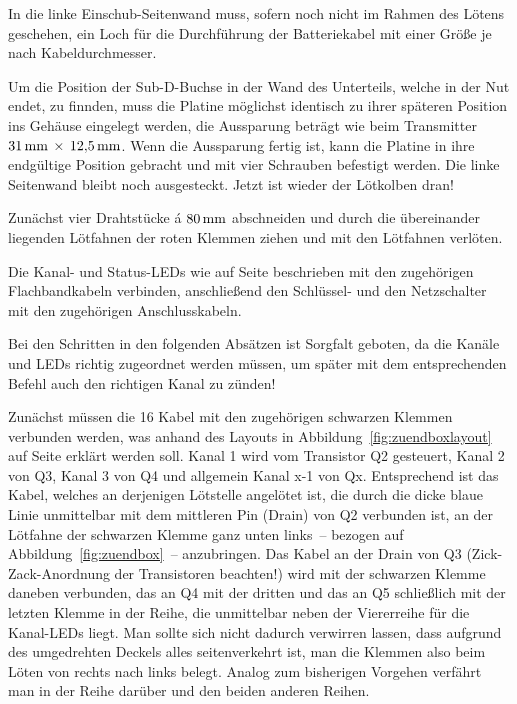 \documentclass[pdftex, parskip, numbers=noenddot, toc=listof]{scrbook}
\begin{document}
	In die linke Einschub-Seitenwand muss, sofern noch nicht im Rahmen des Lötens geschehen, ein Loch für die Durchführung der Batteriekabel mit einer Größe je nach Kabeldurchmesser.

	Um die Position der Sub-D-Buchse in der Wand des Unterteils, welche in der Nut endet, zu finnden, muss die Platine möglichst identisch zu ihrer späteren Position ins Gehäuse eingelegt werden, die Aussparung beträgt wie beim Transmitter $\unit[31]{mm}\,\times\,\unit[12{,}5]{mm}$. Wenn die Aussparung fertig ist, kann die Platine in ihre endgültige Position gebracht und mit vier Schrauben befestigt werden. Die linke Seitenwand bleibt noch ausgesteckt. Jetzt ist wieder der Lötkolben dran!

	Zunächst vier Drahtstücke á $\unit[80]{mm}$ abschneiden und durch die übereinander liegenden Lötfahnen der roten Klemmen ziehen und mit den Lötfahnen verlöten.

	Die Kanal- und Status-LEDs wie auf Seite \pageref{enum:leds} beschrieben mit den zugehörigen Flachbandkabeln verbinden, anschließend den Schlüssel- und den Netzschalter mit den zugehörigen Anschlusskabeln.

	Bei den Schritten in den folgenden Absätzen ist Sorgfalt geboten, da die Kanäle und LEDs richtig zugeordnet werden müssen, um später mit dem entsprechenden Befehl auch den richtigen Kanal zu zünden!

	Zunächst müssen die 16 Kabel mit den zugehörigen schwarzen Klemmen verbunden werden, was anhand des Layouts in Abbildung~\ref{fig:zuendboxlayout} auf Seite \pageref{fig:zuendboxlayout} erklärt werden soll. Kanal 1 wird vom Transistor Q2 gesteuert, Kanal 2 von Q3, Kanal 3 von Q4 und allgemein Kanal x-1 von Qx. Entsprechend ist das Kabel, welches an derjenigen Lötstelle angelötet ist, die durch die dicke blaue Linie unmittelbar mit dem mittleren Pin (Drain) von Q2 verbunden ist, an der Lötfahne der schwarzen Klemme ganz unten links~-- bezogen auf Abbildung~\ref{fig:zuendbox}~-- anzubringen. Das Kabel an der Drain von Q3 (Zick-Zack-Anordnung der Transistoren beachten!) wird mit der schwarzen Klemme daneben verbunden, das an Q4 mit der dritten und das an Q5 schließlich mit der letzten Klemme in der Reihe, die unmittelbar neben der Viererreihe für die Kanal-LEDs liegt. Man sollte sich nicht dadurch verwirren lassen, dass aufgrund des umgedrehten Deckels alles seitenverkehrt ist, man die Klemmen also beim Löten von rechts nach links belegt. Analog zum bisherigen Vorgehen verfährt man in der Reihe darüber und den beiden anderen Reihen.
\end{document}
